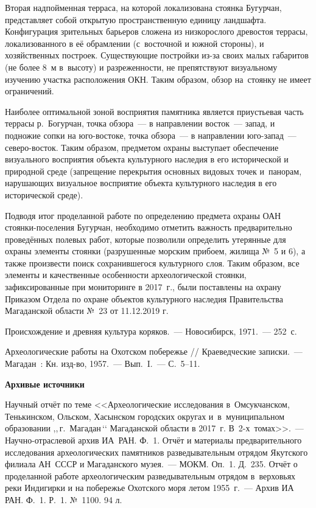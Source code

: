 Вторая надпойменная терраса, на которой локализована стоянка Бугурчан, представляет собой открытую пространственную единицу ландшафта. Конфигурация зрительных барьеров сложена из низкорослого древостоя террасы, локализованного в её обрамлении (с~восточной и южной стороны), и хозяйственных построек. Существующие постройки из-за своих малых габаритов (не более 8~м в~высоту) и разреженности, не препятствуют визуальному изучению участка расположения ОКН. Таким образом, обзор на~стоянку не имеет ограничений.

Наиболее оптимальной зоной восприятия памятника является приустьевая часть террасы р.~Богурчан, точка обзора~--- в направлении восток~--- запад, и подножие сопки на юго-востоке, точка обзора~--- в направлении юго-запад~--- северо-восток. Таким образом, предметом охраны выступает обеспечение визуального восприятия объекта культурного наследия в его исторической и природной среде (запрещение перекрытия основных видовых точек и~панорам, нарушающих визуальное восприятие объекта культурного наследия в его исторической среде).

Подводя итог проделанной работе по определению предмета охраны ОАН стоянки-поселения Бугурчан, необходимо отметить важность предварительно проведённых полевых работ, которые позволили определить утерянные для охраны элементы стоянки (разрушенные морским прибоем, жилища №~5 и 6), а также произвести поиск сохранившегося культурного слоя. Таким образом, все элементы и качественные особенности археологической стоянки, зафиксированные при мониторинге в 2017~г., были поставлены на охрану Приказом Отдела по охране объектов культурного наследия Правительства Магаданской области №~23 от 11.12.2019 г.

\begin{thebibliography}{99}

\bibitem{} Происхождение и древняя культура коряков.~--- Новосибирск, 1971.~--- 252~с.

\bibitem{} Археологические работы на Охотском побережье //  Краеведческие записки.~--- Магадан~: Кн. изд-во, 1957.~--- Вып.~I.~--- С.~5--11.

\textbf{Архивые источники}

\bibitem{} Научный отчёт по теме <<Археологические исследования в~Омсукчанском, Тенькинском, Ольском, Хасынском городских округах и~в~муниципальном образовании ,,\,г.~Магадан\,‘‘ Магаданской области в 2017~г. В~2-х~томах>>.~--- Научно-отраслевой архив ИА~РАН. Ф.~1.
\bibitem{} Отчёт и материалы предварительного исследования археологических памятников разведывательным отрядом Якутского филиала АН~СССР и Магаданского музея.~--- МОКМ. Оп.~1. Д.~235.
\bibitem{} Отчёт о проделанной работе археологическим разведывательным отрядом в~верховьях реки Индигирки и на побережье Охотского моря летом 1955~г.~--- Архив ИА РАН. Ф.~1. Р.~1. №~1100. 94 л.



\end{thebibliography}
